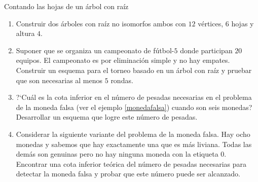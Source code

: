 \begin{section}{Contando las hojas de un árbol con raíz}
\begin{enumerate}[1)]
\item Construir dos árboles con raíz no isomorfos ambos con $12$ vértices, $6$ hojas y altura $4$.	
	
\item Suponer que se organiza un campeonato de fútbol-$5$ donde participan
$20$ equipos. El cam\-peo\-na\-to es por eliminación simple y no hay
empates. Cons\-truir un esquema para el torneo basado en un árbol
con raíz y pruebar que son necesarias al menos $5$ rondas.
\item ?`Cuál es la cota inferior en el número de pesadas necesarias en
el problema de la moneda falsa (ver el ejemplo \ref{monedafalsa}) cuando
son seis monedas? Desarrollar un esquema que logre este número de
pesadas.

\item Considerar la siguiente variante del problema de la moneda falsa.
Hay ocho monedas y sabemos que hay exactamente una que es más
liviana. Todas las demás son genuinas pero no hay ninguna moneda
con la etiqueta $0$. Encontrar una cota inferior teórica del número
de pesadas necesarias para detectar la moneda falsa y probar que
este número puede ser alcanzado.
\end{enumerate}

\end{section}





